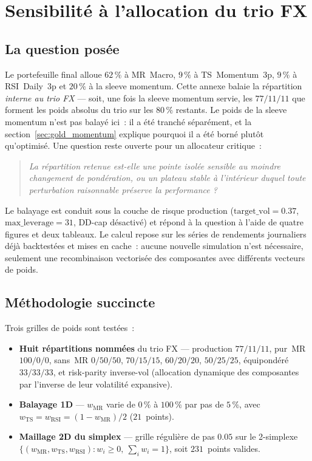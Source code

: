 \section{Sensibilité à l'allocation du trio FX}
\label{app:weight_sensitivity}

\subsection{La question posée}

Le portefeuille final alloue $62\,\%$ à MR~Macro, $9\,\%$ à TS~Momentum~3p, $9\,\%$ à RSI~Daily~3p et $20\,\%$ à la sleeve momentum. Cette annexe balaie la répartition \emph{interne au trio FX} --- soit, une fois la sleeve momentum servie, les $77/11/11$ que forment les poids absolus du trio sur les $80\,\%$ restants. Le poids de la sleeve momentum n'est pas balayé ici~: il a été tranché séparément, et la section~\ref{sec:gold_momentum} explique pourquoi il a été borné plutôt qu'optimisé. Une question reste ouverte pour un allocateur critique~:

\begin{quote}
\emph{La répartition retenue est-elle une pointe isolée sensible au moindre changement de pondération, ou un plateau stable à l'intérieur duquel toute perturbation raisonnable préserve la performance ?}
\end{quote}

Le balayage est conduit sous la couche de risque production ($\mathrm{target\_vol}=0.37$, $\mathrm{max\_leverage}=31$, DD-cap désactivé) et répond à la question à l'aide de quatre figures et deux tableaux. Le calcul repose sur les séries de rendements journaliers déjà backtestées et mises en cache~: aucune nouvelle simulation n'est nécessaire, seulement une recombinaison vectorisée des composantes avec différents vecteurs de poids.

\subsection{Méthodologie succincte}

Trois grilles de poids sont testées~:

\begin{itemize}
\item \textbf{Huit répartitions nommées} du trio FX --- production $77/11/11$, pur~MR $100/0/0$, sans~MR $0/50/50$, $70/15/15$, $60/20/20$, $50/25/25$, équipondéré $33/33/33$, et risk-parity inverse-vol (allocation dynamique des composantes par l'inverse de leur volatilité expansive).
\item \textbf{Balayage 1D} --- $w_{\text{MR}}$ varie de $0\,\%$ à $100\,\%$ par pas de $5\,\%$, avec $w_{\text{TS}} = w_{\text{RSI}} = (1-w_{\text{MR}})/2$ ($21$~points).
\item \textbf{Maillage 2D du simplex} --- grille régulière de pas $0.05$ sur le 2-simplexe $\{(w_{\text{MR}}, w_{\text{TS}}, w_{\text{RSI}}) : w_i \ge 0,\ \sum_i w_i = 1\}$, soit $231$~points valides.
\end{itemize}

